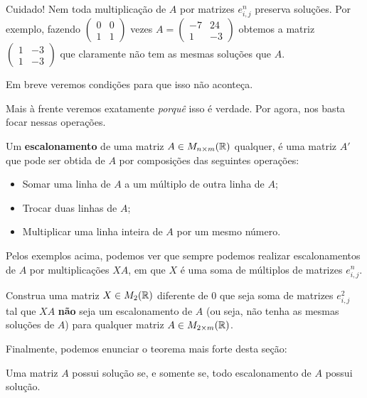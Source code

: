 \begin{rmk}
	Cuidado! Nem toda multiplicação de $A$ por matrizes $e^n_{i,j}$ preserva soluções. Por exemplo, fazendo $\begin{pmatrix}
	0&0\\1&1
	\end{pmatrix}$ vezes $A=\begin{pmatrix}
	-7 & 24\\1&-3
	\end{pmatrix}$ obtemos a matriz $\begin{pmatrix}
	1 & -3\\1&-3
	\end{pmatrix}$ que claramente não tem as mesmas soluções que $A$.
	
	Em breve veremos condições para que isso não aconteça.
\end{rmk}

Mais à frente veremos exatamente \textit{porquê} isso é verdade. Por agora, nos basta focar nessas operações.

\begin{df}
	Um \textbf{escalonamento} de uma matriz $A\in M_{n\times m}(\mathbb R)$ qualquer, é uma matriz $A'$ que pode ser obtida de $A$ por composições das seguintes operações:
	\begin{itemize}
		\item Somar uma linha de $A$ a um múltiplo de outra linha de $A$;
		\item Trocar duas linhas de $A$;
		\item Multiplicar uma linha inteira de $A$ por um mesmo número.
	\end{itemize}
\end{df}

Pelos exemplos acima, podemos ver que sempre podemos realizar escalonamentos de $A$ por multiplicações $XA$, em que $X$ é uma soma de múltiplos de matrizes $e^n_{i,j}$.

\begin{exerc}
	Construa uma matriz $X\in M_2(\mathbb R)$ diferente de 0 que seja soma de matrizes $e^2_{i,j}$ tal que $XA$ \textbf{não} seja um escalonamento de $A$ (ou seja, não tenha as mesmas soluções de $A$) para qualquer matriz $A\in M_{2\times m}(\mathbb R)$.
\end{exerc}

Finalmente, podemos enunciar o teorema mais forte desta seção:

\begin{theorem}\label{thm:sol-escsol}
	Uma matriz $A$ possui solução se, e somente se, todo escalonamento de $A$ possui solução.
\end{theorem}

